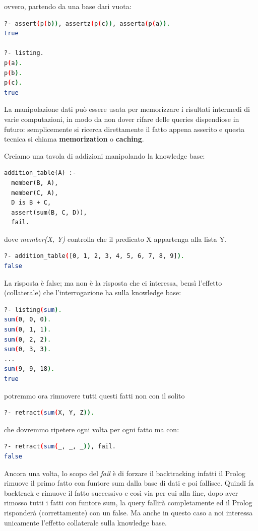 ovvero, partendo da una base dari vuota:
\begin{shaded}
\begin{lstlisting}[language=bash]
?- assert(p(b)), assertz(p(c)), asserta(p(a)).
true

?- listing.
p(a).
p(b).
p(c).
true
\end{lstlisting}
\end{shaded}
La manipolazione dati può essere usata per memorizzare i risultati intermedi di varie computazioni, in modo da non dover rifare
delle queries dispendiose in futuro: semplicemente si ricerca direttamente il fatto appena asserito e
questa tecnica si chiama \textbf{memorization} o \textbf{caching}.
\begin{esempio}
Creiamo una tavola di addizioni manipolando la knowledge base:
\begin{verbatim}
addition_table(A) :-
  member(B, A),
  member(C, A),
  D is B + C,
  assert(sum(B, C, D)),
  fail.
\end{verbatim}
dove \textit{member(X, Y)} controlla che il predicato X appartenga alla lista Y.\\
\begin{shaded}
\begin{lstlisting}[language=bash]
?- addition_table([0, 1, 2, 3, 4, 5, 6, 7, 8, 9]).
false
\end{lstlisting}
\end{shaded}
La risposta è false; ma non è la risposta che ci interessa, bensì l’effetto (collaterale) che l’interrogazione ha sulla knowledge base:
\begin{shaded}
\begin{lstlisting}[language=bash]
?- listing(sum).
sum(0, 0, 0).
sum(0, 1, 1).
sum(0, 2, 2).
sum(0, 3, 3).
...
sum(9, 9, 18).
true
\end{lstlisting}
\end{shaded}
potremmo ora rimuovere tutti questi fatti non con il solito
\begin{shaded}
\begin{lstlisting}[language=bash]
?- retract(sum(X, Y, Z)).
\end{lstlisting}
\end{shaded}
che dovremmo ripetere ogni volta per ogni fatto ma con:
\begin{shaded}
\begin{lstlisting}[language=bash]
?- retract(sum(_, _, _)), fail.
false
\end{lstlisting}
\end{shaded}
Ancora una volta, lo scopo del \emph{fail} è di forzare il backtracking infatti il Prolog rimuove il primo fatto con funtore sum dalla base di dati
e poi fallisce.\newline
Quindi fa backtrack e rimuove il fatto successivo e così via per cui alla fine, dopo aver rimosso tutti i fatti con funtore sum,
la query fallirà completamente ed il Prolog risponderà (correttamente) con un false.\newline
Ma anche in questo caso a noi interessa unicamente l’effetto collaterale sulla knowledge base.
\end{esempio}
